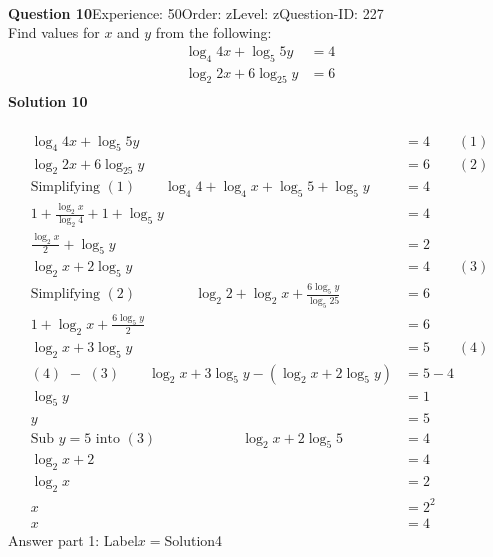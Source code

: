 \documentclass{article}
\begin{document}
\\[4pt]
\noindent\textbf{Question 10}\hspace{20pt}Experience: 50\hspace{20pt}Order: z\hspace{20pt}Level: z\hspace{20pt}Question-ID: 227\\[2pt]
Find values for $x$ and $y$ from the following:
\begin{align*}
\log_{4}4x+\log_{5}5y&=4\\[2pt]
\log_{2}2x+6\log_{25}y&=6\\[-22pt]
\end{align*}
\noindent\textbf{Solution 10}\\[2pt]
\\[-35pt]\begin{align*}
\log_{4}4x+\log_{5}5y&=4\qquad (1)\\[2pt]
\log_{2}2x+6\log_{25}y&=6\qquad (2)\\[2pt]
\text{Simplifying}\,\,(1)\qquad \log_{4}4+\log_{4}x+\log_{5}5+\log_{5}y&=4\\[2pt]
1+\displaystyle\frac{\log_{2}x}{\log_{2}4}+1+\log_{5}y&=4\\[2pt]
\displaystyle\frac{\log_{2}x}{2}+\log_{5}y&=2\\[2pt]
\log_{2}x+2\log_{5}y&=4\qquad (3)\\[2pt]
\text{Simplifying}\,\,(2)\hspace{50pt}\log_{2}2+\log_{2}x+\displaystyle\frac{6\log_{5}y}{\log_{5}25}&=6\\[2pt]
1+\log_{2}x+\displaystyle\frac{6\log_{5}y}{2}&=6\\[2pt]
\log_{2}x+3\log_{5}y&=5\qquad (4)\\[2pt]
(4)\,\,-\,\,(3)\qquad\log_{2}x+3\log_{5}y-(\log_{2}x+2\log_{5}y)&=5-4\\[2pt]
\log_{5}y&=1\\[2pt]
y&=5\\[12pt]
\text{Sub} \,\,y=5\,\,\text{into}\,\,(3)\hspace{73pt} \log_{2}x+2\log_{5}5&=4\\[2pt]
\log_{2}x+2&=4\\[2pt]
\log_{2}x&=2\\[2pt]
x&=2^2\\[2pt]
x&=4
\end{align*}
Answer part 1: \hspace{10pt}Label\hspace{10pt}$x=$\hspace{10pt}Solution\hspace{10pt}4\\
\end{document}
